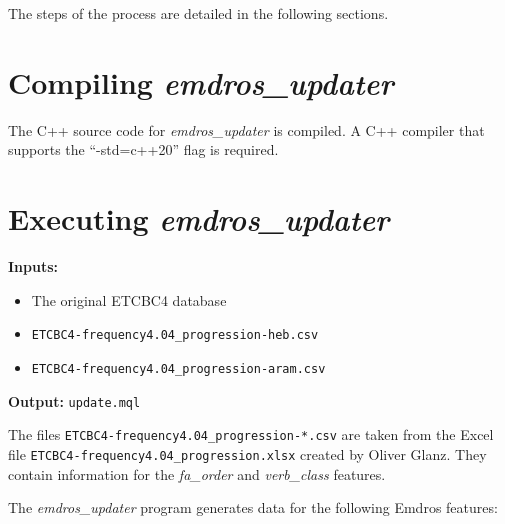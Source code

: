 \documentclass[11pt,oneside,a4paper,article]{memoir}
\begin{document}
The steps of the process are detailed in the following sections.

\section{Compiling \emph{emdros\_updater}}

The C++ source code for \emph{emdros\_updater} is compiled. A C++ compiler that supports the
``-std=c++20'' flag is required.

\section{Executing \emph{emdros\_updater}}

\noindent \textbf{Inputs:}
\begin{itemize}
\item The original ETCBC4 database
\item \texttt{ETCBC4-frequency4.04\_progression-heb.csv}
\item \texttt{ETCBC4-frequency4.04\_progression-aram.csv}
\end{itemize}

\noindent \textbf{Output:} \texttt{update.mql}

\vspace{1ex}

The files \texttt{ETCBC4-frequency4.04\_progression-*.csv} are taken from the Excel file
\texttt{ETCBC4-frequency4.04\_progression.xlsx} created by Oliver Glanz. They contain information
for the \emph{fa\_order} and \emph{verb\_class} features.

The \emph{emdros\_updater} program generates data for the following Emdros features:
\end{document}
